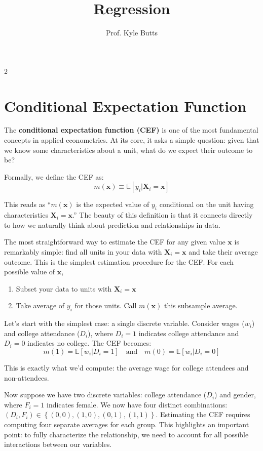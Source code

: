 \documentclass[12pt]{article}
\title{Regression}
\author{Prof. Kyle Butts}
\date{}
\begin{document}
\maketitle
\begin{multicols}{2}

  \section*{Conditional Expectation Function}

  The \textbf{conditional expectation function (CEF)} is one of the most fundamental concepts in applied econometrics.
  At its core, it asks a simple question: given that we know some characteristics about a unit, what do we expect their outcome to be?

  Formally, we define the CEF as:
  $$m(\bm{x}) \equiv \mathbb{E}[y_i|\bm{X}_i = \bm{x}]$$

  This reads as ``$m(\bm{x})$ is the expected value of $y_i$ conditional on the unit having characteristics $\bm{X}_i = \bm{x}$.''
  The beauty of this definition is that it connects directly to how we naturally think about prediction and relationships in data.

  The most straightforward way to estimate the CEF for any given value $\bm{x}$ is remarkably simple: find all units in your data with $\bm{X}_i = \bm{x}$ and take their average outcome.
  This is the simplest estimation procedure for the CEF.
  For each possible value of $\bm{x}$,
  \begin{enumerate}
    \item Subset your data to units with $\bm{X}_i = \bm{x}$
    \item Take average of $y_i$ for those units. Call $m(\bm{x})$ this subsample average.
  \end{enumerate}

  Let's start with the simplest case: a single discrete variable.
  Consider wages ($w_i$) and college attendance ($D_i$), where $D_i = 1$ indicates college attendance and $D_i = 0$ indicates no college.
  The CEF becomes:
  $$
  m(1) = \mathbb{E}[w_i|D_i = 1] \quad\text{and}\quad m(0) = \mathbb{E}[w_i|D_i = 0]
  $$

  This is exactly what we'd compute: the average wage for college attendees and non-attendees.

  Now suppose we have two discrete variables: college attendance ($D_i$) and gender, where $F_i = 1$ indicates female.
  We now have four distinct combinations: $(D_i, F_i) \in \left\{ (0,0), (1,0), (0,1), (1,1) \right\}$.
  Estimating the CEF requires computing four separate averages for each group.
  This highlights an important point: to fully characterize the relationship, we need to account for all possible interactions between our variables.


\end{multicols}
\end{document}
